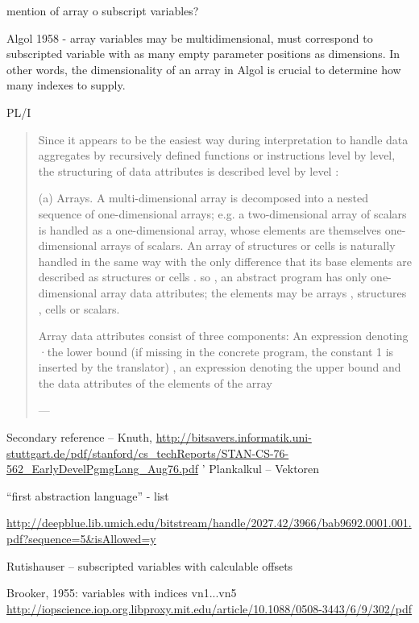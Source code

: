 mention of array o subscript variables?



Algol 1958 - array variables may be multidimensional, must correspond to subscripted variable with as many empty parameter positions as dimensions.
In other words, the dimensionality of an array in Algol is crucial to determine how many indexes to supply.

PL/I
\begin{quote}
Since it appears to be the
easiest way during interpretation to handle data aggregates by recursively defined
functions or instructions level by level, the structuring of data attributes is
described level by level :

(a)
Arrays. A multi-dimensional array is decomposed into a nested sequence of
one-dimensional arrays; e.g. a two-dimensional array of scalars is handled
as a one-dimensional array, whose elements are themselves one-dimensional
arrays of scalars. An array of structures or cells is naturally handled in
the same way with the only difference that its base elements are described
as structures or cells . so , an abstract program has only one-dimensional
array data attributes; the elements may be arrays , structures , cells or
scalars.

Array data attributes consist of three components: An expression denoting
·the lower bound (if missing in the concrete program, the constant 1 is inserted
by the translator) , an expression denoting the upper bound and the
data attributes of the elements of the array

--- \cite[\S 2.3.1, pp. 2-8--9]{Lucas1968}
\end{quote}

Secondary reference – Knuth,
\url{http://bitsavers.informatik.uni-stuttgart.de/pdf/stanford/cs_techReports/STAN-CS-76-562_EarlyDevelPgmgLang_Aug76.pdf}
'
Plankalkul – Vektoren


“first abstraction language” - list

\url{http://deepblue.lib.umich.edu/bitstream/handle/2027.42/3966/bab9692.0001.001.pdf?sequence=5&isAllowed=y}

Rutishauser – subscripted variables with calculable offsets

Brooker, 1955: variables with indices vn1...vn5
\url{http://iopscience.iop.org.libproxy.mit.edu/article/10.1088/0508-3443/6/9/302/pdf}

